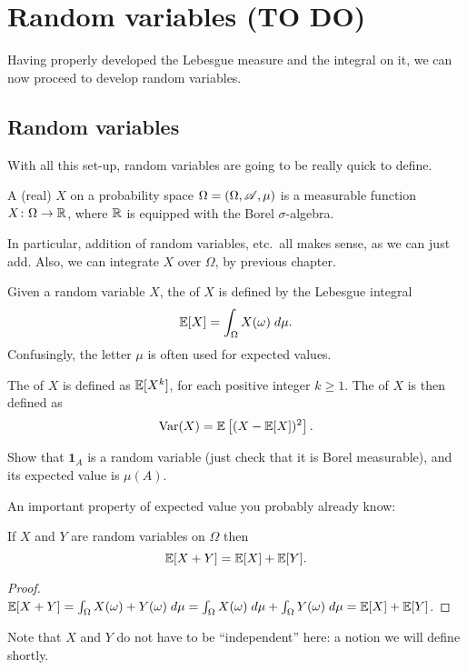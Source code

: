 \chapter{Random variables (TO DO)}
Having properly developed the Lebesgue measure
and the integral on it,
we can now proceed to develop random variables.

\section{Random variables}
With all this set-up, random variables are going to be really quick to define.
\begin{definition}
	A (real)  $X$ on a probability space
	$\Omega = (\Omega, \mathscr A, \mu)$
	is a measurable function $X \colon \Omega \to \mathbb R$,
	where $\mathbb R$ is equipped with the Borel $\sigma$-algebra.
\end{definition}
In particular, addition of random variables, etc.\
all makes sense, as we can just add.
Also, we can integrate $X$ over $\Omega$, by previous chapter.

\begin{definition}
	Given a random variable $X$,
	the  of $X$ is defined by
	the Lebesgue integral
	\[ \mathbb E[X] = \int_{\Omega} X(\omega) \; d\mu. \]
	Confusingly, the letter $\mu$ is often used for expected values.

	The  of $X$ is defined as $\mathbb E[X^k]$,
	for each positive integer $k \ge 1$.
	The  of $X$ is then defined as
	\[ \operatorname{Var}(X) = \mathbb E\left[ (X-\mathbb E[X])^2 \right]. \]
\end{definition}
\begin{ques}
	Show that $\mathbf{1}_A$ is a random variable
	(just check that it is Borel measurable),
	and its expected value is $\mu(A)$.
\end{ques}

An important property of expected value you probably already know:
\begin{theorem}
	If $X$ and $Y$ are random variables on $\Omega$ then
	\[ \mathbb E[X+Y] = \mathbb E[X] + \mathbb E[Y]. \]
\end{theorem}
\begin{proof}
	$\mathbb E[X+Y] = \int_\Omega X(\omega) + Y(\omega) \; d\mu
	= \int_\Omega X(\omega) \; d\mu + \int_\Omega Y(\omega) \; d\mu
	= \mathbb E[X] + \mathbb E[Y]$.
\end{proof}
Note that $X$ and $Y$ do not have to be ``independent'' here:
a notion we will define shortly.

